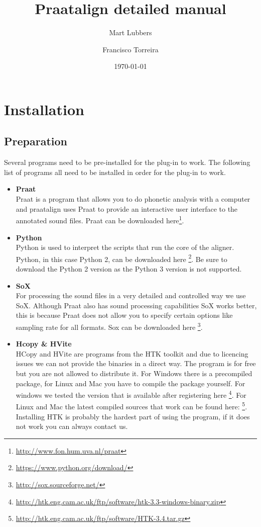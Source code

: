 \documentclass[twoside,a4paper]{book}
\author[1]{Mart Lubbers}
\author[2]{Francisco Torreira}
\affil[1]{\url{mart.lubbers@mpi.nl}}
\affil[2]{\url{francisco.torreira@mpi.nl}}
\title{Praatalign detailed manual}
\date{\today}
\begin{document}
\maketitle
\tableofcontents

\chapter{Installation}
\section{Preparation}
Several programs need to be pre-installed for the plug-in to work. The following
list of programs all need to be installed in order for the plug-in to work.
\begin{itemize}
	\item \textbf{Praat}\\
		Praat is a program that allows you to do phonetic analysis with a computer
		and praatalign uses Praat to provide an interactive user interface to the
		annotated sound files.  Praat can be downloaded
		here\footnote{\url{http://www.fon.hum.uva.nl/praat}}.
	\item \textbf{Python}\\
		Python is used to interpret the scripts that run the core of the aligner.
		Python, in this case Python 2, can be downloaded here
		\footnote{\url{https://www.python.org/download/}}. Be sure to download the
		Python 2 version as the Python 3 version is not supported.
	\item \textbf{SoX}\\
		For processing the sound files in a very detailed and controlled way we
		use SoX. Although Praat also has sound processing capabilities SoX works
		better, this is because Praat does not allow you to specify certain options
		like sampling rate for all formats. Sox can be downloaded here
		\footnote{\url{http://sox.sourceforge.net/}}.
	\item \textbf{Hcopy \& HVite}\\
		HCopy and HVite are programs from the HTK toolkit and due to licencing
		issues we can not provide the binaries in a direct way. The program is for
		free but you are not allowed to distribute it. For Windows there is a
		precompiled package, for Linux and Mac you have to compile the package
		yourself. For windows we tested the version that is available after
		registering here \footnote{
		\url{http://htk.eng.cam.ac.uk/ftp/software/htk-3.3-windows-binary.zip}}.
		For Linux and Mac the latest compiled sources that work can be found here:
		\footnote{\url{http://htk.eng.cam.ac.uk/ftp/software/HTK-3.4.tar.gz}}.
		Installing HTK is probably the hardest part of using the program, if it
		does not work you can always contact us.
\end{itemize}
\end{document}
